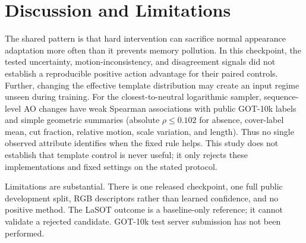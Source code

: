 \documentclass{article}
\begin{document}
\begin{table}[h]
\centering
\caption{Split-controlled reliability follow-up. Baseline calibration AO is
0.847678. All candidates were rejected before held-out testing.}
\end{table}

\section{Discussion and Limitations}
The shared pattern is that hard intervention can sacrifice normal appearance
adaptation more often than it prevents memory pollution. In this checkpoint,
the tested uncertainty, motion-inconsistency, and disagreement signals did not
establish a reproducible positive action advantage for their paired controls.
Further, changing the effective template distribution may create an input
regime unseen during training. For the closest-to-neutral logarithmic
sampler, sequence-level AO changes have weak Spearman associations with public
GOT-10k labels and simple geometric summaries (absolute $\rho\leq0.102$ for
absence, cover-label mean, cut fraction, relative motion, scale variation, and
length). Thus no single observed attribute identifies when the fixed rule helps.
This study does not establish that
template control is never useful; it only rejects these implementations and
fixed settings on the stated protocol.

Limitations are substantial. There is one released checkpoint, one full public
development split, RGB descriptors rather than learned confidence, and no
positive method. The LaSOT outcome is a baseline-only reference; it cannot
validate a rejected candidate. GOT-10k test server submission has not been
performed.
\end{document}
